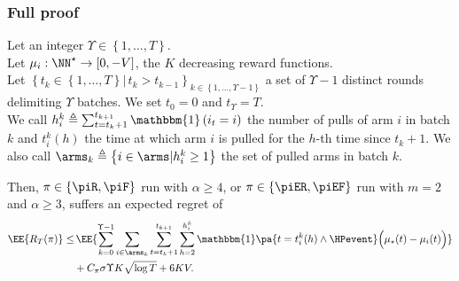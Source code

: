 \subsubsection*{Full proof}
\begin{lemma} %
\label{lem:FP}
Let an integer $\Upsilon \in\left\{ 1, \dots,T\right\}$.\\
Let $\mu_i : \NN^\star \rightarrow \left[0, -V\right]$, the $K$ decreasing reward functions.\\ 
Let $\left\{t_k\in\left\{ 1, \dots,T\right\} \right.\allowbreak\left. |\, t_k > t_{k-1}\right\}_{k\in \left\{ 1, \dots,\Upsilon-1\right\}}$ a set of $\Upsilon - 1$ distinct rounds delimiting $\Upsilon$ batches. We set $t_0=0$ and $t_\Upsilon = T$. \\
We call $h_{i}^{k} \triangleq \sum_{t=t_k +1}^{t_{k+1}} \mathbbm{1}\left(i_{t} = i\right)$ the number of pulls of arm $i$ in batch $k$ and $t_i^k(h)$ the time at which arm $i$ is pulled for the $h$-th time since $t_k + 1$. We also call $\arms_k \triangleq  \left\{ i \in \arms | h_i^k \geq 1\right\}$ the set of pulled arms in batch $k$. 

Then, $\pi \in \left\{\piR, \piF \right\}$ run with $\alpha \geq 4$, or $\pi \in \left\{\piER, \piEF \right\}$ run with $m=2$ and $\alpha \geq 3$, suffers an expected regret of
\begin{align*}
\EE{R_T(\pi)} \leq &  \, \EE{\sum_{k=0}^{\Upsilon-1} \sum_{i\in\arms_k}\sum_{t=t_k +1 }^{t_{k+1}}\sum_{h=2}^{h^k_{i}}\mathbbm{1}\pa{ t = t_i^k(h) \land \HPevent} \Big(\mu_{\star}(t) - \mu_{i}(t)\Big)} \\
&+   C_\pi \sigma \Upsilon K\sqrt{\log{T}} + 6KV.
\end{align*}
\end{lemma}
